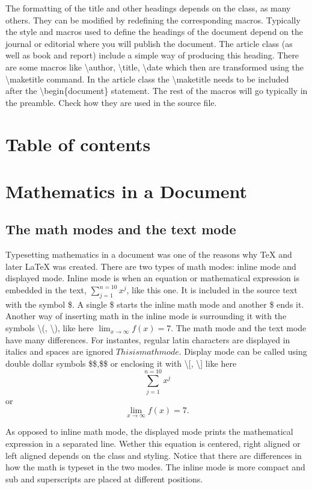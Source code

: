 \documentclass[a4paper]{article}
\newcommand{\bs}[1]{{\color{blue}\textbackslash{}#1}}
\begin{document}
The formatting of the title and other headings depends on the class, as many others. They can be modified by redefining the corresponding macros. Typically the style and macros used to define the headings of the document depend on the journal or editorial where you will publish the document. The article class (as well as book and report) include a simple way of producing this heading. There are some macros like \bs{author}, \bs{title}, \bs{date} which then are transformed using the \bs{maketitle} command. In the article class the \bs{maketitle} needs to be included after the \bs{begin}\{document\} statement. The rest of the macros will go typically in the preamble. Check how they are used in the source file.


\section{Table of contents}


\section{Mathematics in a Document}

\subsection{The math modes and the text mode}

Typesetting mathematics in a document was one of the reasons why \TeX{} and later \LaTeX{} was created. There are two types of math modes: inline mode and displayed mode. Inline mode is when an equation or mathematical expression is embedded in the text, $\sum_{j=1}^{n=10}x^j$, like this one. It is included in the source text with the symbol \$. A single \$ starts the inline math mode and another \$ ends it. Another way of inserting math in the inline mode is surrounding it with the symbols \textbackslash(, \textbackslash), like here  \(\lim_{x\to\infty} f(x) = 7\). The math mode and the text mode have many differences. For instantes, regular latin characters are displayed in italics and spaces are ignored $This is math mode$. Display mode can be called using double dollar symbols \$\$,\$\$ or enclosing it with \textbackslash[, \textbackslash] like here $$\sum_{j=1}^{n=10}x^j$$ or \[\lim_{x\to\infty} f(x) = 7.\]

As opposed to inline math mode, the displayed mode prints the mathematical expression in a separated line. Wether this equation is centered, right aligned or left aligned depends on the class and styling. Notice that there are differences in how the math is typeset in the two modes. The inline mode is more compact and sub and superscripts are placed at different positions.
\end{document}
